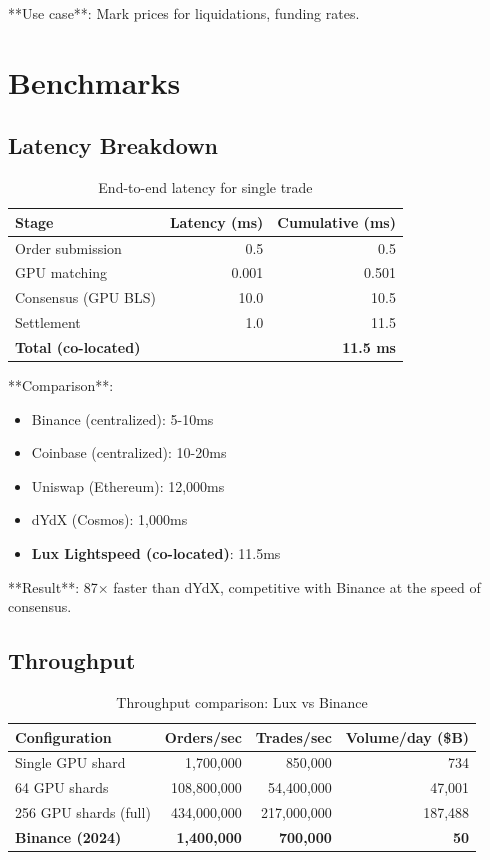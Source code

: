 \documentclass[11pt,letterpaper]{article}
\begin{document}
**Use case**: Mark prices for liquidations, funding rates.

\section{Benchmarks}

\subsection{Latency Breakdown}

\begin{table}[h]
\centering
\begin{tabular}{lrr}
\toprule
\textbf{Stage} & \textbf{Latency (ms)} & \textbf{Cumulative (ms)} \\
\midrule
Order submission & 0.5 & 0.5 \\
GPU matching & 0.001 & 0.501 \\
Consensus (GPU BLS) & 10.0 & 10.5 \\
Settlement & 1.0 & 11.5 \\
\midrule
\textbf{Total (co-located)} & & \textbf{11.5 ms} \\
\bottomrule
\end{tabular}
\caption{End-to-end latency for single trade}
\end{table}

**Comparison**:
\begin{itemize}
    \item Binance (centralized): 5-10ms
    \item Coinbase (centralized): 10-20ms
    \item Uniswap (Ethereum): 12,000ms
    \item dYdX (Cosmos): 1,000ms
    \item \textbf{Lux Lightspeed (co-located)}: 11.5ms
\end{itemize}

**Result**: 87$\times$ faster than dYdX, competitive with Binance at the speed of consensus.

\subsection{Throughput}

\begin{table}[h]
\centering
\begin{tabular}{lrrr}
\toprule
\textbf{Configuration} & \textbf{Orders/sec} & \textbf{Trades/sec} & \textbf{Volume/day (\$B)} \\
\midrule
Single GPU shard & 1,700,000 & 850,000 & 734 \\
64 GPU shards & 108,800,000 & 54,400,000 & 47,001 \\
256 GPU shards (full) & 434,000,000 & 217,000,000 & 187,488 \\
\midrule
\textbf{Binance (2024)} & \textbf{1,400,000} & \textbf{700,000} & \textbf{50} \\
\bottomrule
\end{tabular}
\caption{Throughput comparison: Lux vs Binance}
\end{table}
\end{document}
